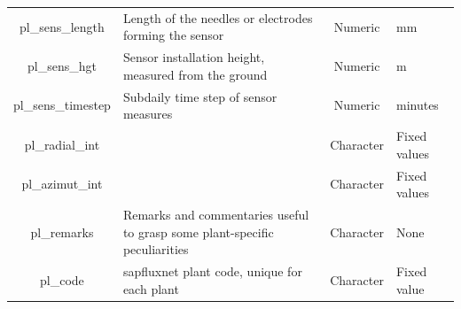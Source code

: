 \documentclass[11pt,twoside]{reedthesis}
\begin{document}
\begin{table}[H]
{\begin{tabular}[t]{c>{\centering\arraybackslash}p{20em}c>{\centering\arraybackslash}p{12em}}
pl\_sens\_length & Length of the needles or electrodes forming the sensor & Numeric & mm\\
pl\_sens\_hgt & Sensor installation height, measured from the ground & Numeric & m\\
pl\_sens\_timestep & Subdaily time step of sensor measures & Numeric & minutes\\
pl\_radial\_int &  & Character & Fixed values\\
pl\_azimut\_int &  & Character & Fixed values\\
pl\_remarks & Remarks and commentaries useful to grasp some plant-specific peculiarities & Character & None\\
pl\_code & sapfluxnet plant code, unique for each plant & Character & Fixed value\\
\bottomrule
\end{tabular}}
\end{table}\newpage
\end{document}

